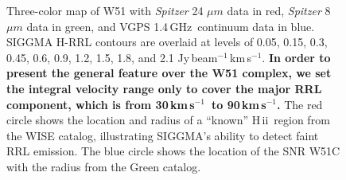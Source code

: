 \documentclass[manuscript]{aastex61}
\newcommand{\hii}{{\rm H\,}{{\sc ii}}}
\newcommand{\kms}{\,km\,s$^{-1}$}
\newcommand{\ghz}{\,GHz}
\newcommand{\um}{\mu m}
\begin{document}
\begin{figure}[htbp]
\centering
{}
\caption{Three-color map of W51 
with {\it Spitzer} 24 $\um$ data in red,  {\it Spitzer} 8 $\um$ data in green, and VGPS 1.4\ghz\ continuum data in blue. 
SIGGMA H-RRL contours are overlaid at levels of 0.05, 0.15, 0.3, 0.45, 0.6, 0.9, 1.2, 1.5, 1.8, and 2.1 Jy\,beam$^{-1}$\kms.
\textbf{In order to present the general feature over the W51 complex, we set the integral velocity range only to cover the major RRL component, which is from 30\kms\ to 90\kms.} The red circle shows the location and radius of a ``known'' \hii\ region from the WISE catalog, illustrating SIGGMA's ability to detect faint RRL emission. The blue circle shows the location of the SNR W51C with the radius from the Green catalog.}\label{w51_map}
\end{figure}
\end{document}
